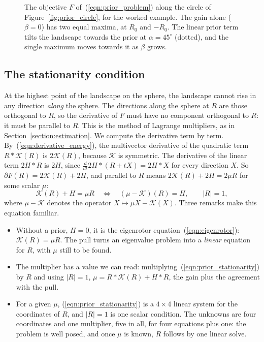 \documentclass{birkjour}
\theoremstyle{definition}
\theoremstyle{remark}
\numberwithin{equation}{section}
\newcommand{\K}{\mathcal{K}}
\begin{document}
\begin{figure}[t]
\centering
{}
\caption{The objective $F$ of~(\ref{eqn:prior_problem}) along the circle of Figure~\ref{fig:prior_circle}, for the worked example. The gain alone ($\beta = 0$) has two equal maxima, at $R_0$ and $-R_0$. The linear prior term tilts the landscape towards the prior at $\alpha = 45^\circ$ (dotted), and the single maximum moves towards it as $\beta$ grows.}
\label{fig:prior_landscape}
\end{figure}

\subsection{The stationarity condition}

At the highest point of the landscape on the sphere, the landscape cannot rise in any direction \emph{along} the sphere. The directions along the sphere at $R$ are those orthogonal to $R$, so the derivative of $F$ must have no component orthogonal to $R$: it must be parallel to $R$. This is the method of Lagrange multipliers, as in Section~\ref{section:estimation}. We compute the derivative term by term. By~(\ref{eqn:derivative_energy}), the multivector derivative of the quadratic term $R * \K(R)$ is $2 \K(R)$, because $\K$ is symmetric. The derivative of the linear term $2 H * R$ is $2 H$, since $\frac{d}{dt} 2 H * (R + t X) = 2 H * X$ for every direction $X$. So $\partial F(R) = 2 \K(R) + 2 H$, and parallel to $R$ means $2 \K(R) + 2 H = 2 \mu R$ for some scalar $\mu$:
\begin{equation}
\label{eqn:prior_stationarity}
\K(R) + H = \mu R \quad \Longleftrightarrow \quad (\mu - \K)(R) = H, \qquad |R| = 1,
\end{equation}
where $\mu - \K$ denotes the operator $X \mapsto \mu X - \K(X)$. Three remarks make this equation familiar.
\begin{itemize}
\item Without a prior, $H = 0$, it is the eigenrotor equation~(\ref{eqn:eigenrotor}): $\K(R) = \mu R$. The pull turns an eigenvalue problem into a \emph{linear} equation for $R$, with $\mu$ still to be found.
\item The multiplier has a value we can read: multiplying~(\ref{eqn:prior_stationarity}) by $R$ and using $|R| = 1$, $\mu = R * \K(R) + H * R$, the gain plus the agreement with the pull.
\item For a given $\mu$, (\ref{eqn:prior_stationarity}) is a $4 \times 4$ linear system for the coordinates of $R$, and $|R| = 1$ is one scalar condition. The unknowns are four coordinates and one multiplier, five in all, for four equations plus one: the problem is well posed, and once $\mu$ is known, $R$ follows by one linear solve.
\end{itemize}
\end{document}
